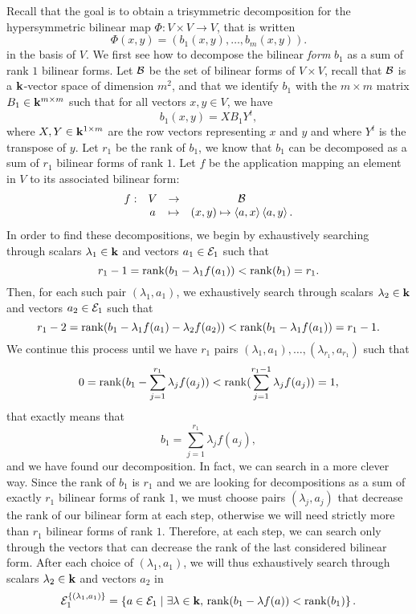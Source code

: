 Recall that the goal is to obtain a trisymmetric decomposition for the
hypersymmetric bilinear map $\Phi:V\times V\to V$, that is written
\[
  \Phi(x, y) = (b_1(x, y), \dots, b_m(x, y)).
\]
in the basis of $V$. We first see how to decompose the bilinear \emph{form}
$b_1$ as a sum of rank $1$ bilinear forms. Let $\mathcal{B}$ be the set of bilinear forms
of $V\times V$, recall that $\mathcal{B}$ is a $\mathbf{k}$-vector space of dimension $m^2$, and
that we identify $b_1$ with the $m\times m$ matrix $B_1\in\mathbf{k}^{m\times m}$ 
such that for all vectors $x, y\in V$, we have
\[
  b_1(x, y) = X B_1 Y^t,
\]
where $X, Y\in\mathbf{k}^{1\times m}$ are the row vectors representing $x$ and $y$ and
where $Y^t$ is the transpose of $y$. Let $r_1$ be the rank of $b_1$, we know
that $b_1$ can be decomposed as a sum of $r_1$ bilinear forms of rank $1$. Let
$f$ be the application mapping an element in $V$ to its associated bilinear
form:
\[
  \begin{array}{cccc}
    f: & V & \to & \mathcal{B}\\
    & a & \mapsto & (x, y)\mapsto\left\langle a,x\right\rangle\left\langle a,y\right\rangle.
  \end{array}
\]
In order to find these decompositions, we begin by exhaustively searching through scalars $\lambda_1\in\mathbf{k}$ and vectors
$a_1\in \mathcal{E}_1$ such that
\[
  r_1-1=\operatorname{rank}(b_1-\lambda_1 f(a_1)) < \operatorname{rank}(b_1)=r_1.
\]
Then, for each such pair $(\lambda_1, a_1)$, we exhaustively search through
scalars $\lambda_2\in\mathbf{k}$ and vectors $a_2\in \mathcal{E}_1$ such that
\[
  r_1-2=\operatorname{rank}(b_1-\lambda_1 f(a_1)-\lambda_2f(a_2)) < \operatorname{rank}(b_1-\lambda_1
  f(a_1))=r_1-1.
\]
We continue this process until we have $r_1$ pairs $(\lambda_1, a_1), \dots,
(\lambda_{r_1}, a_{r_1})$ such that
\[
  0 = \operatorname{rank}(b_1-\sum_{j=1}^{r_1}\lambda_jf(a_j)) <
  \operatorname{rank}(\sum_{j=1}^{r_1-1}\lambda_jf(a_j)) = 1,
\]
that exactly means that
\[
  b_1 = \sum_{j=1}^{r_1}\lambda_jf(a_j),
\]
and we have found our decomposition.
In fact, we can search in a more clever way. Since the rank of $b_1$ is $r_1$
and we are looking for decompositions as a sum of exactly $r_1$ bilinear forms of
rank $1$, we must choose
pairs $(\lambda_j, a_j)$ that decrease the rank of our bilinear form at each
step, otherwise we will need strictly more than $r_1$ bilinear forms of rank
$1$. Therefore, at each step, we can search only through the vectors that can
decrease the rank of the last considered bilinear form. After each choice of
$(\lambda_1, a_1)$, we will thus exhaustively search through scalars
$\lambda_2\in\mathbf{k}$ and vectors $a_2$ in
\[
  \mathcal{E}_1^{\left\{ (\lambda_1, a_1) \right\}} = \left\{
  a\in\mathcal{E}_1\;|\;\exists\lambda\in\mathbf{k},\,\operatorname{rank}(b_1-\lambda f(a)) <\operatorname{rank}(b_1)
\right\}.
\]
